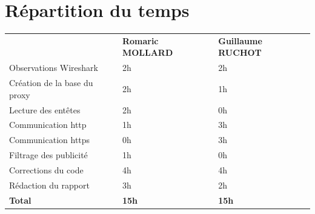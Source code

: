 \documentclass{scrreprt}
\begin{document}
\section{Répartition du temps}

\begin{tabular}{lll}
                                          & \textbf{Romaric MOLLARD} & \textbf{Guillaume RUCHOT} \\
Observations Wireshark                    & 2h              & 2h            \\
Création de la base du proxy              & 2h              & 1h            \\
Lecture des entêtes                       & 2h              & 0h            \\
Communication http                        & 1h              & 3h            \\
Communication https                       & 0h              & 3h            \\
Filtrage des publicité                    & 1h              & 0h            \\
Corrections du code                       & 4h              & 4h           \\
Rédaction du rapport                      & 3h              & 2h           \\
\textbf{Total}                            & \textbf{15h}             & \textbf{15h}
\end{tabular}
\end{document}
